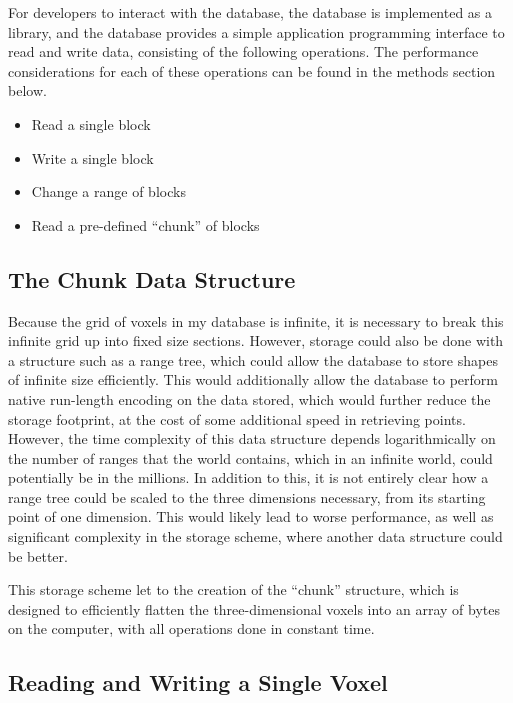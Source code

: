 \documentclass[10pt,twocolumn]{article}
\begin{document}
For developers to interact with the database, the database is implemented as a
library, and the database provides a simple application programming interface to
read and write data, consisting of the following operations. The performance
considerations for each of these operations can be found in the methods section
below.

\begin{itemize}
  \item Read a single block
  \item Write a single block
  \item Change a range of blocks
  \item Read a pre-defined ``chunk'' of blocks
\end{itemize}

\subsection{The Chunk Data Structure}

Because the grid of voxels in my database is infinite, it is necessary to break
this infinite grid up into fixed size sections. However, storage could also be
done with a structure such as a range tree\cite{enwiki:1175117303}, which could
allow the database to store shapes of infinite size efficiently. This would
additionally allow the database to perform native run-length encoding on the
data stored, which would further reduce the storage footprint, at the cost of
some additional speed in retrieving points. However, the time complexity of this
data structure depends logarithmically on the number of ranges that the world
contains, which in an infinite world, could potentially be in the millions. In
addition to this, it is not entirely clear how a range tree could be scaled to
the three dimensions necessary, from its starting point of one dimension. This
would likely lead to worse performance, as well as significant complexity in the
storage scheme, where another data structure could be better.

This storage scheme let to the creation of the ``chunk'' structure, which is
designed to efficiently flatten the three-dimensional voxels into an array of
bytes on the computer, with all operations done in constant time.

\subsection{Reading and Writing a Single Voxel}
\end{document}
